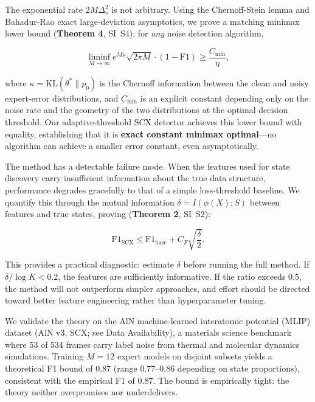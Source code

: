 \documentclass[12pt,a4paper]{article}
\theoremstyle{definition}
\theoremstyle{plain}
\theoremstyle{remark}
\begin{document}
The exponential rate $2M\Delta_s^2$ is not arbitrary. Using the Chernoff-Stein lemma and Bahadur-Rao exact large-deviation asymptotics, we prove a matching minimax lower bound (\textbf{Theorem 4}, SI~S4): for \emph{any} noise detection algorithm,

\begin{equation}
\liminf_{M\to\infty} e^{M\kappa} \sqrt{2\pi M} \cdot (1 - \mathrm{F1}) \geq \frac{C_{\min}}{\eta},
\end{equation}

where $\kappa = \mathrm{KL}(\theta^* \| p_0)$ is the Chernoff information between the clean and noisy expert-error distributions, and $C_{\min}$ is an explicit constant depending only on the noise rate and the geometry of the two distributions at the optimal decision threshold. Our adaptive-threshold SCX detector achieves this lower bound with equality, establishing that it is \textbf{exact constant minimax optimal}---no algorithm can achieve a smaller error constant, even asymptotically.

The method has a detectable failure mode. When the features used for state discovery carry insufficient information about the true data structure, performance degrades gracefully to that of a simple loss-threshold baseline. We quantify this through the mutual information $\delta = I(\phi(X); S)$ between features and true states, proving (\textbf{Theorem 2}, SI~S2):

\begin{equation}
\mathrm{F1}_{\mathrm{SCX}} \leq \mathrm{F1}_{\mathrm{base}} + C_F \sqrt{\frac{\delta}{2}}.
\end{equation}

This provides a practical diagnostic: estimate $\delta$ before running the full method. If $\delta / \log K < 0.2$, the features are sufficiently informative. If the ratio exceeds 0.5, the method will not outperform simpler approaches, and effort should be directed toward better feature engineering rather than hyperparameter tuning.

We validate the theory on the AlN machine-learned interatomic potential (MLIP) dataset (AlN v3, SCX; see Data Availability), a materials science benchmark where 53 of 534 frames carry label noise from thermal and molecular dynamics simulations. Training $M=12$ expert models on disjoint subsets yields a theoretical F1 bound of $0.87$ (range $0.77$--$0.86$ depending on state proportions), consistent with the empirical F1 of $0.87$. The bound is empirically tight: the theory neither overpromises nor underdelivers.
\end{document}
